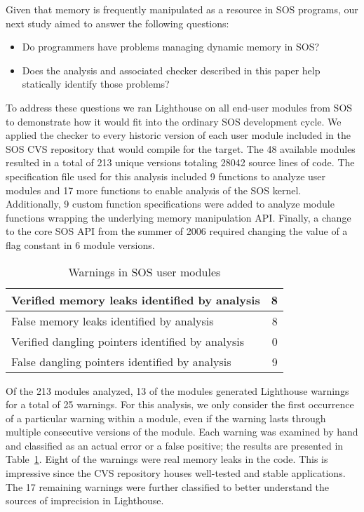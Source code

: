 Given that memory is frequently manipulated as a resource in SOS
programs, our next study aimed to answer the following questions:
%
\begin{itemize}
%
\item Do programmers have problems managing dynamic memory in SOS?
%
\item Does the analysis and associated checker described in this paper
help statically identify those problems?
%
\end{itemize}



To address these questions we ran Lighthouse on all end-user modules
from SOS to demonstrate how it would fit into the ordinary SOS
development cycle.  
%
We applied the checker to every historic version of each user module
included in the SOS CVS repository that would compile for the
 target.  
%
The 48 available modules resulted in a total of 213 unique versions
totaling 28042 source lines of code.
%
The specification file used for this analysis included 9 functions to
analyze user modules and 17 more functions to enable analysis of the SOS
kernel.
%
Additionally, 9 custom function specifications were added to analyze
module functions wrapping the underlying memory manipulation API.
%
Finally, a change to the core SOS API from the summer of 2006 required
changing the value of a flag constant in 6 module versions.



\begin{table}
\caption{Warnings in SOS user modules}
%
\label{tab:module}
\centering 
\begin{tabular}{| l | r |}
    \hline 
    Verified memory leaks identified by analysis & 8 \\
    \hline
    False memory leaks identified by analysis & 8 \\
    \hline 
    Verified dangling pointers identified by analysis & 0 \\
    \hline 
    False dangling pointers identified by analysis & 9 \\
    \hline 
\end{tabular} 
%
\end{table}



Of the 213 modules analyzed, 13 of the modules generated Lighthouse
warnings for a total of 25 warnings.
%
For this analysis, we only consider the first occurrence of a particular
warning within a module, even if the warning lasts through multiple
consecutive versions of the module.  
%
Each warning was examined by hand and classified as an actual error or a
false positive; the results are presented in Table~\ref{tab:module}.  
%
Eight of the warnings were real memory leaks in the code.  This is
impressive since the CVS repository houses well-tested and stable
applications.
%
The 17 remaining warnings were further classified to better understand
the sources of imprecision in Lighthouse.  


